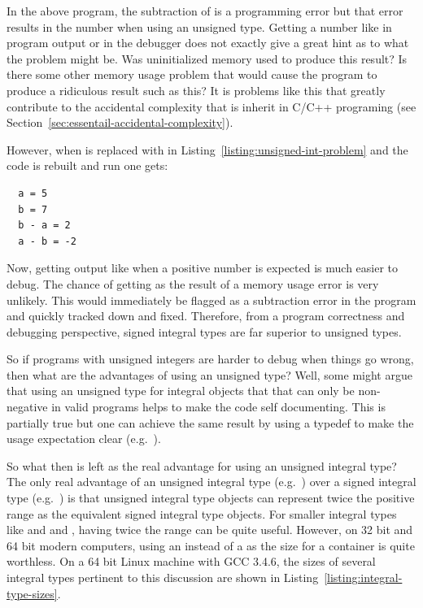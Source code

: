 \documentclass[pdf,ps2pdf,11pt]{SANDreport}
\begin{document}
In the above program, the subtraction of {} is a
programming error but that error results in the number
{} when using an unsigned type.  Getting a
number like {} in program output or in the
debugger does not exactly give a great hint as to what the problem
might be.  Was uninitialized memory used to produce this result?  Is
there some other memory usage problem that would cause the program to
produce a ridiculous result such as this?  It is problems like this
that greatly contribute to the accidental complexity that is inherit
in C/C++ programing (see Section~\ref{sec:essentail-accidental-complexity}).

However, when {} is replaced with {} in Listing~\ref{listing:unsigned-int-problem} and the code is
rebuilt and run one gets:


{\small\begin{verbatim}
  a = 5
  b = 7
  b - a = 2
  a - b = -2
\end{verbatim}}


Now, getting output like {} when a positive number is expected
is much easier to debug.  The chance of getting {} as the
result of a memory usage error is very unlikely.  This would
immediately be flagged as a subtraction error in the program and
quickly tracked down and fixed.  Therefore, from a program correctness
and debugging perspective, signed integral types are far superior to
unsigned types.

So if programs with unsigned integers are harder to debug when things
go wrong, then what are the advantages of using an unsigned type?
Well, some might argue that using an unsigned type for integral
objects that that can only be non-negative in valid programs helps to
make the code self documenting.  This is partially true but one can
achieve the same result by using a typedef to make the usage
expectation clear (e.g.\ {}).

So what then is left as the real advantage for using an unsigned
integral type?  The only real advantage of an unsigned integral type
(e.g.\ {}) over a signed integral type (e.g.\
{}) is that unsigned integral type objects can represent
twice the positive range as the equivalent signed integral type
objects.  For smaller integral types like {} and and
{}, having twice the range can be quite useful.
However, on 32 bit and 64 bit modern computers, using an
{} instead of a {} as the
size for a container is quite worthless.  On a 64 bit Linux machine
with GCC 3.4.6, the sizes of several integral types pertinent to this
discussion are shown in Listing~\ref{listing:integral-type-sizes}.
\end{document}
